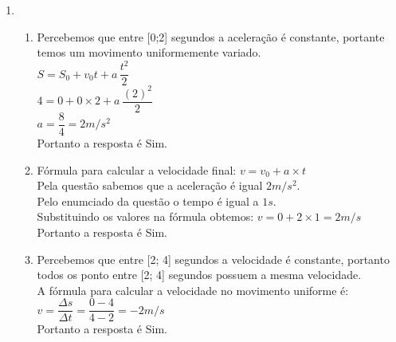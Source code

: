 \documentclass[a4paper, 12pt]{article}
\begin{document}
\begin{enumerate}
\item \begin{enumerate}
	\item Percebemos que entre [0;2] segundos a aceleração é constante, portante temos um movimento uniformemente variado.\\
	
	$S = S_0 + v_0t + a\,\dfrac{t^2}{2}$\\
	$4 = 0 + 0 \times2 + a\,\dfrac{(2)^2}{2}$\\
	$a = \dfrac{8}{4} =  2 m/s^2$\\
	
	Portanto a resposta é Sim.\\
	
	\item Fórmula para calcular a velocidade final: $v = v_0 + a \times t$ \\
	Pela questão sabemos que a aceleração é igual $2 m/s^2$.\\
	Pelo enumciado da questão o tempo é igual a $1s$.\\
	Substituindo os valores na fórmula obtemos: $v = 0 + 2 \times 1 = 2 m/s$ \\
	
	Portanto a resposta é Sim. \\

	\item Percebemos que entre [2; 4] segundos a velocidade é constante, portanto todos os ponto entre [2; 4] segundos possuem a mesma velocidade.\\
	
	A fórmula para calcular a velocidade no movimento uniforme é:\\ $v = \dfrac{\Delta s}{\Delta t} =  \dfrac{0 - 4}{4 - 2} = -2m/s$ \\ 
	
		Portanto a resposta é Sim. \\


\end{enumerate}
	
	 
\end{enumerate}

 
\end{document}
